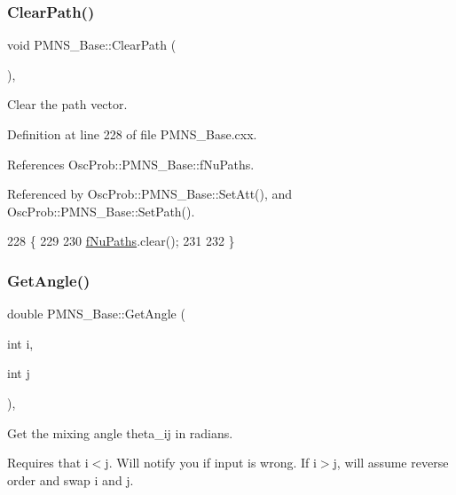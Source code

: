 \subsubsection{\texorpdfstring{Clear\+Path()}{ClearPath()}}
{\footnotesize\ttfamily void P\+M\+N\+S\+\_\+\+Base\+::\+Clear\+Path (\begin{DoxyParamCaption}{ }\end{DoxyParamCaption})\hspace{0.3cm}{\ttfamily [virtual]}, {\ttfamily [inherited]}}

Clear the path vector. 

Definition at line 228 of file P\+M\+N\+S\+\_\+\+Base.\+cxx.



References Osc\+Prob\+::\+P\+M\+N\+S\+\_\+\+Base\+::f\+Nu\+Paths.



Referenced by Osc\+Prob\+::\+P\+M\+N\+S\+\_\+\+Base\+::\+Set\+Att(), and Osc\+Prob\+::\+P\+M\+N\+S\+\_\+\+Base\+::\+Set\+Path().


\begin{DoxyCode}
228                          \{
229 
230   \hyperlink{classOscProb_1_1PMNS__Base_a69db9d57e12fc7cbe0431bc6c18fac93}{fNuPaths}.clear();
231 
232 \}
\end{DoxyCode}
\mbox{\label{classOscProb_1_1PMNS__Base_acee137091304c919642293ddf015bbc8}} 
\subsubsection{\texorpdfstring{Get\+Angle()}{GetAngle()}}
{\footnotesize\ttfamily double P\+M\+N\+S\+\_\+\+Base\+::\+Get\+Angle (\begin{DoxyParamCaption}\item[{int}]{i,  }\item[{int}]{j }\end{DoxyParamCaption})\hspace{0.3cm}{\ttfamily [virtual]}, {\ttfamily [inherited]}}

Get the mixing angle theta\+\_\+ij in radians.

Requires that i$<$j. Will notify you if input is wrong. If i$>$j, will assume reverse order and swap i and j.


